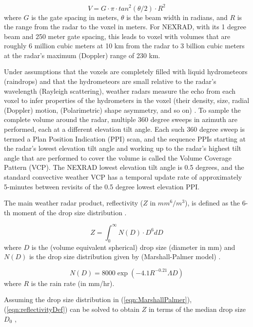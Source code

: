 \documentclass[proposal]{umassthesis}
\begin{document}
\begin{equation}
V = G \cdot \pi \cdot tan^{2}(\theta/2) \cdot R^2
\end{equation}
 where $G$ is the gate spacing in meters, $\theta$ is the beam width in radians, and $R$ is the range from the radar to the voxel in meters. For NEXRAD, with its 1 degree beam and 250 meter gate spacing, this leads to voxel with volumes that are roughly 6 million cubic meters at 10 km from the radar to 3 billion cubic meters at the radar's maximum (Doppler) range of 230 km.

Under assumptions that the voxels are completely filled with liquid hydrometeors (raindrops) and that the hydrometeors are small relative to the radar's wavelength (Rayleigh scattering), weather radars measure the echo from each voxel to infer properties of the hydrometers in the voxel (their density, size, radial (Doppler) motion, (Polarimetric) shape asymmetry, and so on) \cite{bringi2001polarimetric} \cite{doviak1993doppler}. To sample the complete volume around the radar, multiple 360 degree sweeps in azimuth are performed, each at a different elevation tilt angle. Each such 360 degree sweep is termed a Plan Position Indication (PPI) scan, and the sequence PPIs starting at the radar's lowest elevation tilt angle and working up to the radar's highest tilt angle that are performed to cover the volume is called the Volume Coverage Pattern (VCP). The NEXRAD lowest elevation tilt angle is 0.5 degrees, and the standard convective weather VCP has a temporal update rate of approximately 5-minutes between revisits of the 0.5 degree lowest elevation PPI.

The main weather radar product, reflectivity ($Z$ in $mm^6/m^3$), is defined as the 6-th moment of the drop size distribution \cite{doviak1993doppler}. 

\begin{equation}
Z = \int_{0}^{\infty} N(D) \cdot D^6 dD
\label{eqn:reflectivityDef}
\end{equation}
where $D$ is the (volume equivalent spherical) drop size (diameter in mm) and $N(D)$ is the drop size distribution given by (Marshall-Palmer model) \cite{doviak1993doppler}. 

\begin{equation}
N(D) = 8000 \exp (-4.1 R^{-0.21} \Lambda D)
\label{eqn:MarshallPalmer}
\end{equation}
where $R$ is the rain rate (in mm/hr).

Assuming the drop size distribution in (\ref{eqn:MarshallPalmer}), (\ref{eqn:reflectivityDef}) can be solved to obtain $Z$ in terms of the median drop size $D_{0}$  \cite{doviak1993doppler},
\end{document}
